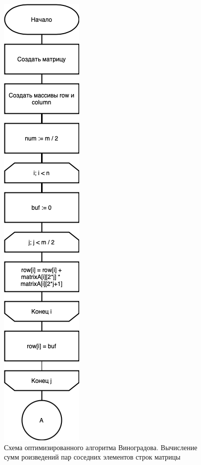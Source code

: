\begin{figure}[h]
    \centering
    \includegraphics[width=0.25\linewidth]{img/WinogradOptA.jpg}
    \caption{Схема оптимизированного алгоритма Виноградова. Вычисление сумм роизведений 
    пар соседних элементов строк матрицы}
    \label{fig:mpr}
\end{figure}

